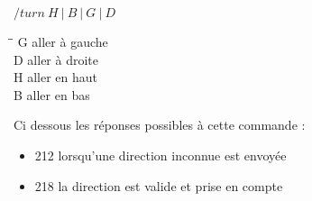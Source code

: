 \par

$/turn ~ {H ~ | ~ B ~ |  ~ G ~ | ~ D}$

\begin{tabbing}
\hspace{1cm}\=\hspace{2cm}\=\kill
G \>  aller à \> gauche \\
D \>  aller à \> droite \\
H \>  aller en \> haut \\
B \>  aller en \> bas
\end{tabbing} 

Ci dessous les réponses possibles à cette commande :
\begin{itemize}
	\item 212 lorsqu'une direction inconnue est envoyée
	\item 218 la direction est valide et prise en compte\\
\end{itemize}
